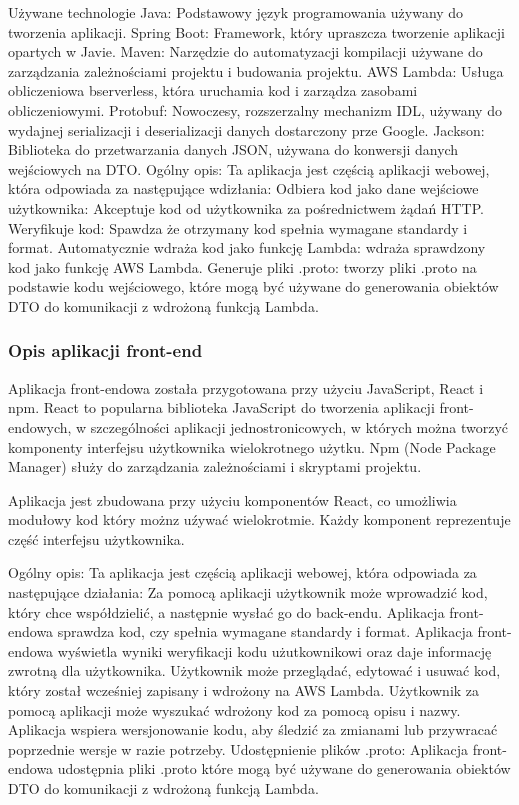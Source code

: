 \documentclass[runningheads,12pt]{llncs}
\begin{document}
Używane technologie
Java: Podstawowy język programowania używany do tworzenia aplikacji.
Spring Boot: Framework, który upraszcza tworzenie aplikacji opartych w Javie.
Maven: Narzędzie do automatyzacji kompilacji używane do zarządzania zależnościami projektu i budowania projektu.
AWS Lambda: Usługa obliczeniowa bserverless, która uruchamia kod i zarządza zasobami obliczeniowymi.
Protobuf: Nowoczesy, rozszerzalny mechanizm IDL, używany do wydajnej serializacji i deserializacji danych dostarczony prze Google.
Jackson: Biblioteka do przetwarzania danych JSON, używana do konwersji danych wejściowych na DTO.
Ogólny opis:
Ta aplikacja jest częścią aplikacji webowej, która odpowiada za następujące wdizłania:
Odbiera kod jako dane wejściowe użytkownika: Akceptuje kod od użytkownika za pośrednictwem żądań HTTP.
Weryfikuje kod: Spawdza że otrzymany kod spełnia wymagane standardy i format.
Automatycznie wdraża kod jako funkcję Lambda: wdraża sprawdzony kod jako funkcję AWS Lambda.
Generuje pliki .proto: tworzy pliki .proto na podstawie kodu wejściowego, które mogą być używane do generowania obiektów DTO do komunikacji z wdrożoną funkcją Lambda.

\subsubsection{Opis aplikacji front-end}

Aplikacja front-endowa została przygotowana przy użyciu JavaScript, React i npm.
React to popularna biblioteka JavaScript do tworzenia aplikacji front-endowych, w szczególności aplikacji jednostronicowych, w których można tworzyć komponenty interfejsu użytkownika wielokrotnego użytku.
Npm (Node Package Manager) służy do zarządzania zależnościami i skryptami projektu.

Aplikacja jest zbudowana przy użyciu komponentów React, co umożliwia modułowy kod który możnz uźywać wielokrotmie. Każdy komponent reprezentuje część interfejsu użytkownika.

Ogólny opis:
Ta aplikacja jest częścią aplikacji webowej, która odpowiada za następujące działania:
Za pomocą aplikacji użytkownik może wprowadzić kod, który chce współdzielić, a następnie wysłać go do back-endu.
Aplikacja front-endowa sprawdza kod, czy spełnia wymagane standardy i format.
Aplikacja front-endowa wyświetla wyniki weryfikacji kodu użutkownikowi oraz daje informację zwrotną dla użytkownika.
Użytkownik może przeglądać, edytować i usuwać kod, który został wcześniej zapisany i wdrożony na AWS Lambda.
Użytkownik za pomocą aplikacji może wyszukać wdrożony kod za pomocą opisu i nazwy.
Aplikacja wspiera wersjonowanie kodu, aby śledzić za zmianami lub przywracać poprzednie wersje w razie potrzeby.
Udostępnienie plików .proto: Aplikacja front-endowa udostępnia pliki .proto które mogą być używane do generowania obiektów DTO do komunikacji z wdrożoną funkcją Lambda.
\end{document}
